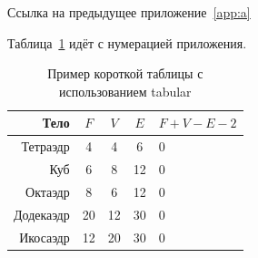 
Ссылка на предыдущее приложение~\ref{app:a}

Таблица~\ref{tab:b1} идёт с нумерацией приложения.

\begin{table}    
    \caption{Пример короткой таблицы с использованием tabular}
    \begin{tabular}{|r|c|c|c|l|}\hline
    Тело      & $F$ & $V$  & $E$ & $F+V-E-2$ \\ \hline
    Тетраэдр  & 4   & 4    & 6   & 0         \\ \hhline{~-~-~}
    Куб       & 6   & 8    & 12  & 0         \\ \hhline{--~~~}
    Октаэдр   & 8   & 6    & 12  & 0         \\ \hhline{-----}
    Додекаэдр & 20  & 12   & 30  & 0         \\ \hline
    Икосаэдр  & 12  & 20   & 30  & 0         \\ \hline
    \end{tabular}
    \label{tab:b1}
\end{table}
